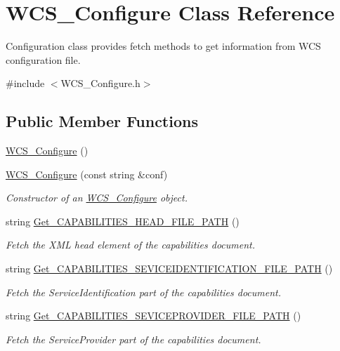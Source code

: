 \hypertarget{classWCS__Configure}{
\section{WCS\_\-Configure Class Reference}
\label{classWCS__Configure}
}


Configuration class provides fetch methods to get information from WCS configuration file.  




{\ttfamily \#include $<$WCS\_\-Configure.h$>$}

\subsection*{Public Member Functions}
\begin{DoxyCompactItemize}
\item 
\hyperlink{classWCS__Configure_a8f0f3520d76723409b2290ce3d5ec3de}{WCS\_\-Configure} ()
\item 
\hyperlink{classWCS__Configure_a69a5f47a39b58a80f3ba4baaf32c9693}{WCS\_\-Configure} (const string \&conf)
\begin{DoxyCompactList}\small\item\em Constructor of an \hyperlink{classWCS__Configure}{WCS\_\-Configure} object. \end{DoxyCompactList}\item 
string \hyperlink{classWCS__Configure_a17e6c9417cf036ab459e1cd36aadcdaa}{Get\_\-CAPABILITIES\_\-HEAD\_\-FILE\_\-PATH} ()
\begin{DoxyCompactList}\small\item\em Fetch the XML head element of the capabilities document. \end{DoxyCompactList}\item 
string \hyperlink{classWCS__Configure_aa24220528f8fc68dd379db5b95943dd2}{Get\_\-CAPABILITIES\_\-SEVICEIDENTIFICATION\_\-FILE\_\-PATH} ()
\begin{DoxyCompactList}\small\item\em Fetch the ServiceIdentification part of the capabilities document. \end{DoxyCompactList}\item 
string \hyperlink{classWCS__Configure_a4d6eca21bef095f73a75f8c1d74c32eb}{Get\_\-CAPABILITIES\_\-SEVICEPROVIDER\_\-FILE\_\-PATH} ()
\begin{DoxyCompactList}\small\item\em Fetch the ServiceProvider part of the capabilities document. \end{DoxyCompactList}\item 

\end{DoxyCompactItemize}
